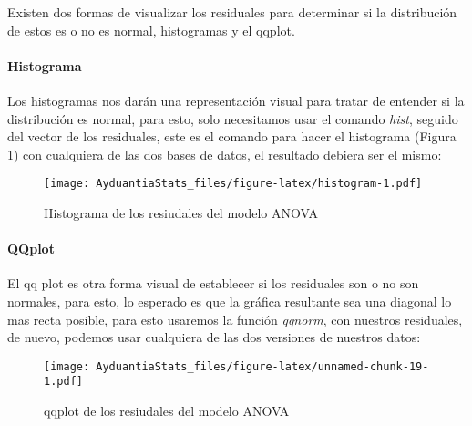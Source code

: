 \documentclass[]{book}
\newenvironment{Shaded}{\begin{snugshade}}{\end{snugshade}}
\newcommand{\KeywordTok}[1]{\textcolor[rgb]{0.13,0.29,0.53}{\textbf{#1}}}
\newcommand{\NormalTok}[1]{#1}
\newcommand{\OperatorTok}[1]{\textcolor[rgb]{0.81,0.36,0.00}{\textbf{#1}}}
\let\oldparagraph\paragraph
\renewcommand{\paragraph}[1]{\oldparagraph{#1}\mbox{}}
\begin{document}
Existen dos formas de visualizar los residuales para determinar si la distribución de estos es o no es normal, histogramas y el qqplot.

\hypertarget{histograma}{%
\paragraph{Histograma}\label{histograma}}

Los histogramas nos darán una representación visual para tratar de entender si la distribución es normal, para esto, solo necesitamos usar el comando \emph{hist}, seguido del vector de los residuales, este es el comando para hacer el histograma (Figura \ref{fig:histogram}) con cualquiera de las dos bases de datos, el resultado debiera ser el mismo:

\begin{Shaded}
\end{Shaded}

\begin{figure}
\centering
\texttt{[image: AyduantiaStats\_files/figure-latex/histogram-1.pdf]}
\caption{\label{fig:histogram}Histograma de los resiudales del modelo ANOVA}
\end{figure}

\hypertarget{qqplot}{%
\paragraph{QQplot}\label{qqplot}}

El qq plot es otra forma visual de establecer si los residuales son o no son normales, para esto, lo esperado es que la gráfica resultante sea una diagonal lo mas recta posible, para esto usaremos la función \emph{qqnorm}, con nuestros residuales, de nuevo, podemos usar cualquiera de las dos versiones de nuestros datos:

\begin{Shaded}
\end{Shaded}

\begin{figure}
\centering
\texttt{[image: AyduantiaStats\_files/figure-latex/unnamed-chunk-19-1.pdf]}
\caption{\label{fig:unnamed-chunk-19}qqplot de los resiudales del modelo ANOVA}
\end{figure}
\end{document}
